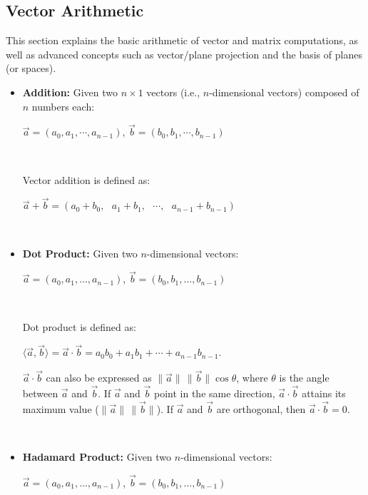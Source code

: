 

\subsection{Vector Arithmetic}
\label{subsec:vector-arithmetic}

This section explains the basic arithmetic of vector and matrix computations, as well as advanced concepts such as vector/plane projection and the basis of planes (or spaces). 


\begin{tcolorbox}[title={\textbf{\tboxdef{\ref*{subsec:vector-arithmetic}} Vector Arithmetic}}]

\begin{itemize}
\item \textbf{Addition:} Given two $n \times 1$ vectors (i.e., $n$-dimensional vectors) composed of $n$ numbers each:

$\vec{a} = (a_0, a_1,\cdots, a_{n-1})$, $\vec{b} = (b_0, b_1,\cdots, b_{n-1})$

$ $

Vector addition is defined as: 

$ \vec{a} + \vec{b} = (a_0 + b_0, \text{ } a_1  +  b_1, \text{ }\cdots, \text{ } a_{n-1}  +  b_{n-1})$

$ $

\item \textbf{Dot Product:} Given two $n$-dimensional vectors:

$\vec{a} = (a_0, a_1,\ldots, a_{n-1})$, $\vec{b} = (b_0, b_1,\ldots, b_{n-1})$

$ $

Dot product is defined as: 

$\langle \vec{a}, \vec{b} \rangle =  \vec{a} \cdot \vec{b} = a_0 b_0 + a_1 b_1 +\cdots + a_{n-1} b_{n-1}$.

$\vec{a} \cdot \vec{b}$ can also be expressed as $\|\vec{a}\|\,\|\vec{b}\|\cos\theta$, where $\theta$ is the angle between $\vec{a}$ and $\vec{b}$. If $\vec{a}$ and $\vec{b}$ point in the same direction, $\vec{a}\cdot\vec{b}$ attains its maximum value ($\|\vec{a}\|\,\|\vec{b}\|$). If $\vec{a}$ and $\vec{b}$ are orthogonal, then $\vec{a}\cdot\vec{b} = 0$.

$ $


\item \textbf{Hadamard Product:} Given two $n$-dimensional vectors:

$\vec{a} = (a_0, a_1,\ldots, a_{n-1})$, $\vec{b} = (b_0, b_1,\ldots, b_{n-1})$


\end{itemize}
\end{tcolorbox}
